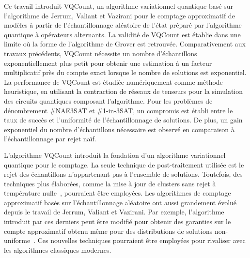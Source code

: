 \Conclusion %


Ce travail introduit VQCount, un algorithme variationnel quantique basé sur l'algorithme de Jerrum, Valiant et Vazirani pour le comptage approximatif de modèles à partir de l'échantillonnage aléatoire de l'état préparé par l'algorithme quantique à opérateurs alternants. La validité de VQCount est établie dans une limite où la forme de l'algorithme de Grover est retrouvée. Comparativement aux travaux précédents, VQCount nécessite un nombre d'échantillons exponentiellement plus petit pour obtenir une estimation à un facteur multiplicatif près du compte exact lorsque le nombre de solutions est exponentiel. La performance de VQCount est étudiée numériquement comme méthode heuristique, en utilisant la contraction de réseaux de tenseurs pour la simulation des circuits quantiques composant l'algorithme. Pour les problèmes de dénombrement \#NAE3SAT et \#1-in-3SAT, un compromis est établi entre le taux de succès et l'uniformité de l'échantillonnage de solutions. De plus, un gain exponentiel du nombre d'échantillons nécessaire est observé en comparaison à l'échantillonnage par rejet naïf.  

L'algorithme VQCount introduit la fondation d'un algorithme variationnel quantique pour le comptage. La seule technique de post-traitement utilisée est le rejet des échantillons n'appartenant pas à l'ensemble de solutions. Toutefois, des techniques plus élaborées, comme la mise à jour de clusters sans rejet à température nulle~\cite{ochoaFeedingMultitudePolynomialtime2019}, pourraient être employées. Les algorithmes de comptage approximatif basés sur l'échantillonnage aléatoire ont aussi grandement évolué depuis le travail de Jerrum, Valiant et Vazirani. Par exemple, l'algorithme introduit par ces derniers peut être modifié pour obtenir des garanties sur le compte approximatif obtenu même pour des distributions de solutions non-uniforme~\cite{gomesSamplingModelCounting2007}. Ces nouvelles techniques pourraient être employées pour rivaliser avec les algorithmes classiques modernes.


